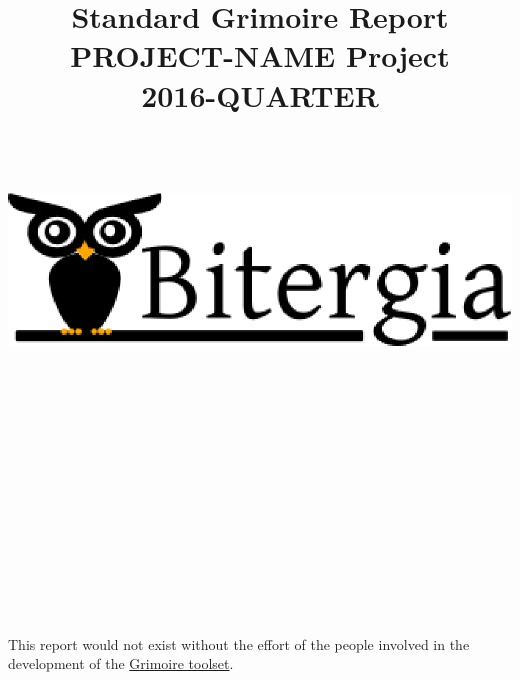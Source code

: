 \documentclass[a4wide,11pt]{article}
\begin{document}
\title{Standard Grimoire Report \\
  PROJECT-NAME Project \\
      2016-QUARTER \\
        ~~\\~~\\  \includegraphics[scale=.35]{logo}       \\}




\maketitle


\newpage
~~\\~\\~\\~\\


~~\\~~\\

~~\\
~~\\

\begin{tabular}{p{5cm}p{10cm}}

\end{tabular}

~~\\
~~\\

This report would not exist without the effort of the people involved in the development of the \href{http://grimoirelab.github.io}{Grimoire toolset}.

~~\\
~~\\
~~\\
~~\\
~~\\
~~\\
\end{document}
